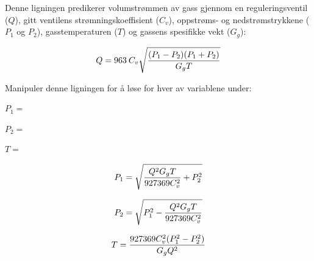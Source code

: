

Denne ligningen predikerer volumstrømmen av gass gjennom en reguleringsventil ($Q$), gitt ventilens strømningskoeffisient ($C_v$), oppstrøms- og nedstrømstrykkene ($P_1$ og $P_2$), gasstemperaturen ($T$) og gassens spesifikke vekt ($G_g$):

$$Q = 963 \> C_v \sqrt{{(P_1 - P_2) (P_1 + P_2)} \over {G_g T}}$$

Manipuler denne ligningen for å løse for hver av variablene under:

\vskip 10pt

$P_1 =$

\vskip 10pt

$P_2 =$

\vskip 10pt

$T =$

\vskip 10pt







$$P_1 = \sqrt{{Q^2 G_g T \over 927369 C_v^2} + P_2^2}$$

\vskip 20pt

$$P_2 = \sqrt{P_1^2 - {Q^2 G_g T \over 927369 C_v^2}}$$

\vskip 20pt

$$T = {927369 C_v^2 (P_1^2 - P_2^2) \over G_g Q^2}$$










